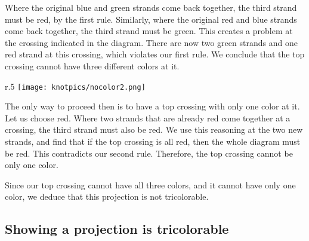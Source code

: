 \documentclass[12pt,letterpaper]{article}
\theoremstyle{definition}
\begin{document}
Where the original blue and green strands come back together, the third strand must be red, by the first rule.
Similarly, where the original red and blue strands come back together, the third strand must be green.
This creates a problem at the crossing indicated in the diagram.
There are now two green strands and one red strand at this crossing, which violates our first rule. We conclude that the top crossing cannot have three different colors at it.

\begin{wrapfigure}{r}{.5\textwidth}
    \centering
    \texttt{[image: knotpics/nocolor2.png]}
\end{wrapfigure}
The only way to proceed then is to have a top crossing with only one color at it.
Let us choose red.
Where two strands that are already red come together at a crossing, the third strand must also be red.
We use this reasoning at the two new strands, and find that if the top crossing is all red, then the whole diagram must be red. 
This contradicts our second rule. 
Therefore, the top crossing cannot be only one color.

Since our top crossing cannot have all three colors, and it cannot have only one color, we deduce that this projection is not tricolorable.

\subsection*{Showing a projection is tricolorable}
\end{document}
